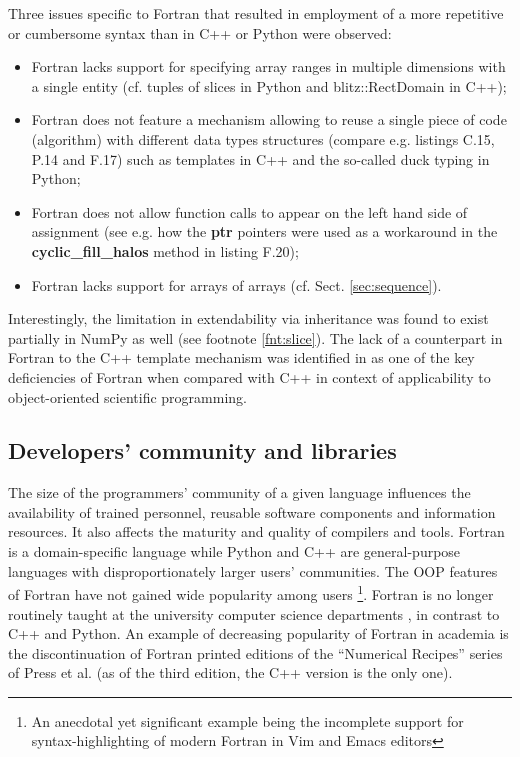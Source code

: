 \documentclass[twocolumn]{article}
\newcommand{\changed}[1]{#1}
\newcommand{\removed}[1]{#1}
\newcommand{\prog}[1]{{\rm\bf#1}}
\begin{document}
  Three issues specific to Fortran that 
    resulted in employment of a more repetitive or cumbersome syntax than in C++ or Python
    were observed:
  \begin{itemize}
    \item{Fortran lacks support for specifying array ranges in multiple dimensions
      with a single entity (cf. tuples of slices in Python and blitz::RectDomain in C++);
    }
    \item{Fortran does not feature a mechanism allowing to reuse a single piece of code (algorithm)
      with different data \removed{types} \changed{structures} (compare e.g. listings C.15, P.14 and F.17) such as
      templates in C++ and the so-called duck typing in Python;} 
    \item{Fortran does not allow function calls to appear on the left hand side
      of assignment (see e.g. how the \prog{ptr} pointers were used as a workaround in the \prog{cyclic\_fill\_halos}
      method in listing F.20);}
    \item{Fortran lacks support for arrays of arrays (cf. Sect. \ref{sec:sequence}).}
  \end{itemize}
  Interestingly, the limitation in extendability via inheritance was found to
    exist partially in NumPy as well (see footnote \ref{fnt:slice}).
  The lack of a counterpart in Fortran to the C++ template mechanism was identified in
    \citep{Cary_et_al_1997}
    as one of the key deficiencies of Fortran when compared with C++ in context 
    of applicability to object-oriented scientific programming.

  \subsection{Developers' community and libraries}%

  The size of the programmers' community of a given language 
    influences the availability of trained personnel, 
    reusable software components and information resources.
  It also affects the maturity and quality of compilers and tools. 
  Fortran is a domain-specific language while Python and C++ are general-purpose languages
    with disproportionately larger users' communities.
  The OOP features of Fortran have not gained
    wide popularity among users \citep{Worth_2008}\footnote{An anecdotal yet significant
    example being the incomplete support for syntax-highlighting of modern Fortran in Vim and Emacs editors}.
  Fortran is no longer routinely taught at the \changed{university computer science
    departments} \citep{Kendall_et_al_2008}, in contrast to C++ and Python.
  An example of decreasing popularity of Fortran in academia 
    is the discontinuation of Fortran printed editions of the ``Numerical Recipes'' 
    series of Press et al. \changed{(as of the third edition, the C++ version is the only one)}.
 
\end{document}
